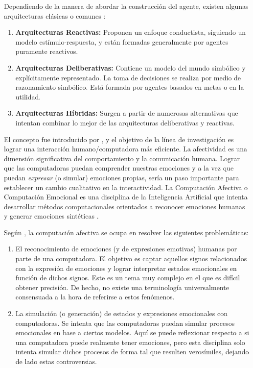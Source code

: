 Dependiendo de la manera de abordar la construcción del agente, existen algunas
arquitecturas clásicas o comunes \citep{perozo2011}:

\begin{enumerate}
\item \textbf{Arquitecturas Reactivas:} Proponen un enfoque conductista, siguiendo un modelo
estímulo-respuesta, y están formadas generalmente por agentes puramente
reactivos.
\item \textbf{Arquitecturas Deliberativas:} Contiene un modelo del mundo
simbólico y explícitamente representado. La toma de decisiones se realiza por
medio de razonamiento simbólico. Está formada por agentes basados en metas o en
la utilidad.
\item \textbf{Arquitecturas Híbridas:} Surgen a partir de numerosas
alternativas que intentan combinar lo mejor de las arquitecturas deliberativas y
reactivas.
\end{enumerate}


El concepto fue introducido por \cite{picard1995}, y el objetivo de la
línea de investigación es lograr una interacción humano/computadora más
eficiente. La afectividad es una dimensión significativa del comportamiento y la
comunicación humana. Lograr que las computadoras puedan comprender nuestras
emociones y a la vez que puedan \textit{expresar} (o simular) emociones propias, sería
un paso importante para establecer un cambio cualitativo en la interactividad.
La Computación Afectiva  o Computación
Emocional es una disciplina de la Inteligencia Artificial que intenta
desarrollar métodos computacionales orientados a reconocer emociones humanas y
generar emociones sintéticas \citep{causa2008}.

Según \cite{causa2008}, la computación afectiva se ocupa en resolver las
siguientes problemáticas:

\begin{enumerate}
\item El reconocimiento de emociones (y de expresiones emotivas)
humanas por parte de una computadora. El objetivo es captar aquellos signos
relacionados con la expresión de emociones y lograr interpretar estados
emocionales en función de dichos signos. Este es un tema muy complejo en el que
es difícil obtener precisión. De hecho, no existe una terminología
universalmente consensuada a la hora de referirse a estos fenómenos.
\item La simulación (o generación) de estados y expresiones emocionales con computadoras.
Se intenta que las computadoras puedan simular procesos emocionales en base a
ciertos modelos. Aquí se puede reflexionar respecto a si una computadora puede
realmente tener emociones, pero esta disciplina solo intenta simular dichos
procesos de forma tal que resulten verosímiles, dejando de lado estas
controversias.
\end{enumerate}

